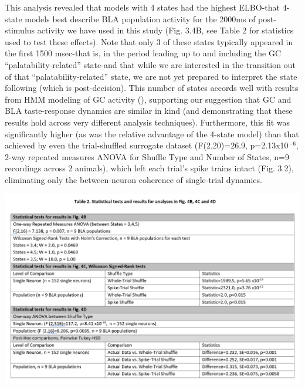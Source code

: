 \begin{refsection}
This analysis revealed that models with 4 states had the highest ELBO-that 4-state models best describe BLA population activity for the 2000ms of post-stimulus activity we have used in this study (Fig. 3.4B, see Table 2 for statistics used to test these effects). Note that only 3 of these states typically appeared in the first 1500 msec-that is, in the period leading up to and including the GC “palatability-related” state-and that while we are interested in the transition out of that “palatability-related” state, we are not yet prepared to interpret the state following (which is post-decision). This number of states accords well with results from HMM modeling of GC activity (\cite{jones2007a,sadacca2016a}), supporting our suggestion that GC and BLA taste-response dynamics are similar in kind (and demonstrating that these results hold across very different analysis techniques). Furthermore, this fit was significantly higher (as was the relative advantage of the 4-state model) than that achieved by even the trial-shuffled surrogate dataset (F(2,20)=26.9, p=2.13x10$^{-6}$, 2-way repeated measures ANOVA for Shuffle Type and Number of States, n=9 recordings across 2 animals), which left each trial’s spike trains intact (Fig. 3.2), eliminating only the between-neuron coherence of single-trial dynamics. 

\noindent
\begin{tabular}
\centering
    \includegraphics[width=\linewidth]{mahmood_22_figures/table2.PNG}
\end{tabular}


\end{refsection}
